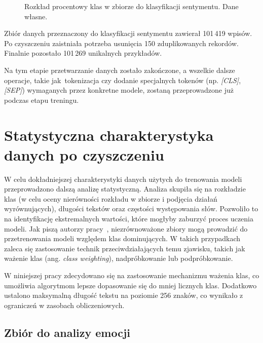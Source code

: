 \begin{figure}[H]
    \centering
    \caption{Rozkład procentowy klas w zbiorze do klasyfikacji sentymentu. Dane własne.}
    \label{fig:sentiment-distribution}
\end{figure}

Zbiór danych przeznaczony do klasyfikacji sentymentu zawierał 101\,419 wpisów. Po czyszczeniu zaistniała potrzeba usunięcia 150 zduplikowanych rekordów. Finalnie pozostało 101\,269 unikalnych przykładów.

Na tym etapie przetwarzanie danych zostało zakończone, a wszelkie dalsze operacje, takie jak~tokenizacja czy dodanie specjalnych tokenów (np. \textit{[CLS]}, \textit{[SEP]}) wymaganych przez konkretne modele, zostaną przeprowadzone już podczas etapu treningu.

\section{Statystyczna charakterystyka danych po czyszczeniu}

W celu dokładniejszej charakterystyki danych użytych do trenowania modeli przeprowadzono dalszą analizę statystyczną. Analiza skupiła się na rozkładzie klas (w celu oceny nierówności rozkładu w zbiorze i podjęcia działań wyrównujących), długości tekstów oraz częstości występowania słów. Pozwoliło to na identyfikację  ekstremalnych wartości, które mogłyby zaburzyć proces uczenia modeli. Jak piszą autorzy pracy~\cite{ClassImbalance}, niezrównoważone zbiory mogą prowadzić do przetrenowania modeli względem klas dominujących. W takich przypadkach zaleca się zastosowanie technik przeciwdziałających temu zjawisku, takich jak ważenie klas (ang. \textit{class weighting}), nadpróbkowanie lub podpróbkowanie. 

W niniejszej pracy zdecydowano się na zastosowanie mechanizmu ważenia klas, co umożliwia algorytmom lepsze dopasowanie się do mniej licznych klas. Dodatkowo ustalono maksymalną długość tekstu na poziomie 256 znaków, co wynikało z ograniczeń w zasobach obliczeniowych.


\subsection{Zbiór do analizy emocji}
